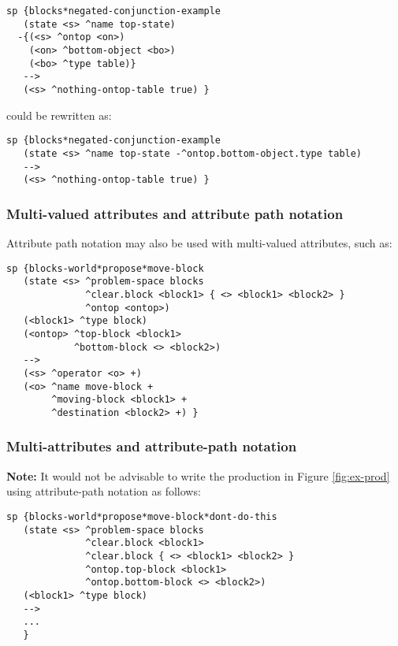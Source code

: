 \begin{verbatim}
sp {blocks*negated-conjunction-example
   (state <s> ^name top-state)
  -{(<s> ^ontop <on>)
    (<on> ^bottom-object <bo>)
    (<bo> ^type table)}
   -->
   (<s> ^nothing-ontop-table true) }
\end{verbatim}

could be rewritten as:

\begin{verbatim}
sp {blocks*negated-conjunction-example
   (state <s> ^name top-state -^ontop.bottom-object.type table)
   -->
   (<s> ^nothing-ontop-table true) }
\end{verbatim}


\subsubsection*{Multi-valued attributes and attribute path notation}


Attribute path notation may also be used with multi-valued attributes, such as:

\begin{verbatim}
sp {blocks-world*propose*move-block
   (state <s> ^problem-space blocks
              ^clear.block <block1> { <> <block1> <block2> }
              ^ontop <ontop>)
   (<block1> ^type block)
   (<ontop> ^top-block <block1>
            ^bottom-block <> <block2>)
   -->
   (<s> ^operator <o> +)
   (<o> ^name move-block +
        ^moving-block <block1> +
        ^destination <block2> +) }
\end{verbatim}


\subsubsection*{Multi-attributes and attribute-path notation}
\label{SYNTAX-pm-lhs-caveat}

\textbf{Note:} It would not be advisable to write the production in Figure \ref{fig:ex-prod} using attribute-path notation as follows:

\begin{verbatim}
sp {blocks-world*propose*move-block*dont-do-this
   (state <s> ^problem-space blocks
              ^clear.block <block1>
              ^clear.block { <> <block1> <block2> }
              ^ontop.top-block <block1>
              ^ontop.bottom-block <> <block2>)
   (<block1> ^type block)
   -->
   ...
   }
\end{verbatim}

